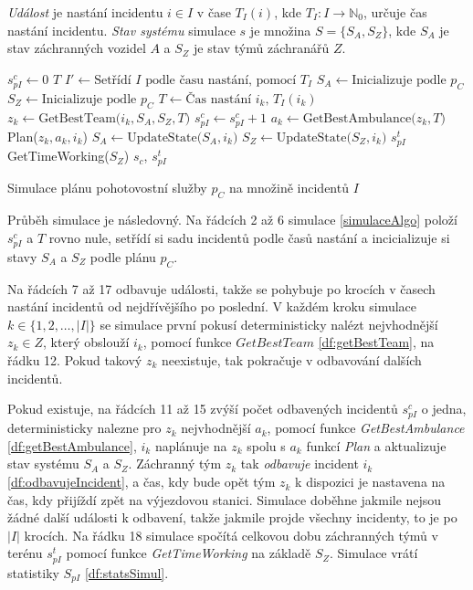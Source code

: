 \textit{Událost} je nastání incidentu $i \in I$ v čase $T_I(i)$, kde $T_I \colon I \rightarrow \mathbb{N}_0$, určuje čas nastání incidentu.
\textit{Stav systému} simulace $s$ je množina $S = \{ S_A, S_Z \}$, kde $S_A$ je stav záchranných vozidel $A$ a $S_Z$ je stav týmů záchranářů $Z$. 

\begin{algorithm}[h]
  \begin{algorithmic}[1]
    \State $s^{c}_{pI} \gets 0$
    \State $T$ 
    \State $I' \gets \mbox{Setřídí $I$ podle času nastání, pomocí $T_I$}$
    \State $S_A \gets \mbox{Inicializuje podle $p_C$}$
    \State $S_Z \gets \mbox{Inicializuje podle $p_C$}$
      \State $T \gets \mbox{Čas nastání $i_k$, $T_I(i_k)$}$
      \State $z_k \gets \mbox{GetBestTeam($i_k, S_A, S_Z, T$)}$
        \State $s^{c}_{pI} \gets s^{c}_{pI} + 1$
        \State $a_k \gets \mbox{GetBestAmbulance($z_k, T$)}$
        \State Plan($z_k, a_k, i_k$)
        \State $S_A \gets \mbox{UpdateState($S_A, i_k$)}$
        \State $S_Z \gets \mbox{UpdateState($S_Z, i_k$)}$
      \EndIf
    \EndFor
    \State $s^t_{pI}$ \gets \mbox{GetTimeWorking($S_Z$)}
    \State \Return $s_{c}$, $s^t_{pI}$
  \EndFunction
  \end{algorithmic}
  \caption{Simulace plánu pohotovostní služby $p_C$ na množině incidentů $I$}
  \label{simulaceAlgo}
\end{algorithm}

\vspace*{10px}

Průběh simulace je následovný. 
Na řádcích 2 až 6 simulace \ref{simulaceAlgo} položí $s^{c}_{pI}$ a $T$ rovno nule, setřídí si sadu incidentů podle časů nastání
a incicializuje si stavy $S_A$ a $S_Z$ podle plánu $p_C$.

Na řádcích 7 až 17 odbavuje události, takže se pohybuje po krocích v časech nastání incidentů od nejdřívějšího po poslední.
V každém kroku simulace $k \in \{ 1, 2, \dots , |I|\}$ se simulace první pokusí deterministicky nalézt nejvhodnější $z_k \in Z$, který obslouží $i_k$,
pomocí funkce $\textit{GetBestTeam}$ \ref{df:getBestTeam}, na řádku 12.
Pokud takový $z_k$ neexistuje, tak pokračuje v odbavování dalších incidentů.

Pokud existuje, na řádcích 11 až 15 zvýší počet odbavených incidentů $s^c_{pI}$ o jedna,
deterministicky nalezne pro $z_k$ nejvhodnější $a_k$, pomocí funkce \textit{GetBestAmbulance} \ref{df:getBestAmbulance},
$i_k$ naplánuje na $z_k$ spolu s $a_k$ funkcí \textit{Plan} a aktualizuje stav systému $S_A$ a $S_Z$.
Záchranný tým $z_k$ tak \textit{odbavuje} incident $i_k$ \ref{df:odbavujeIncident}, a čas, kdy bude opět tým $z_k$ k dispozici je nastavena na čas, kdy přijíždí zpět na výjezdovou stanici.
Simulace doběhne jakmile nejsou žádné další události k odbavení, takže jakmile projde všechny incidenty, to je po $|I|$ krocích.
Na řádku 18 simulace spočítá celkovou dobu záchranných týmů v terénu $s^t_{pI}$ pomocí funkce \textit{GetTimeWorking} na základě $S_Z$.
Simulace vrátí statistiky $S_{pI}$ \ref{df:statsSimul}.

